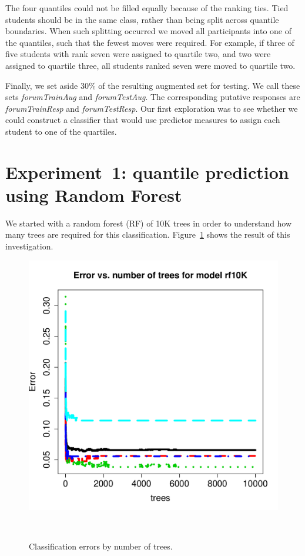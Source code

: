 The four quantiles could not be filled equally because of the ranking
ties. Tied students should be in the same class, rather than being
split across quantile boundaries. When such splitting occurred we
moved all participants into one of the quantiles, such that the fewest
moves were required. For example, if three of five students with rank
seven were assigned to quartile two, and two were assigned to quartile
three, all students ranked seven were moved to quartile two.

Finally, we set aside 30\% of the resulting augmented set for
testing.  We call these sets \emph{forumTrainAug} and
\emph{forumTestAug}. The corresponding putative responses are
\emph{forumTrainResp} and \emph{forumTestResp}.  Our first exploration
was to see whether we could construct a classifier that would use
predictor measures to assign each student to one of the quartiles.


\section{Experiment~1: quantile prediction using Random Forest}

We started with a random forest (RF) of 10K trees in order to
understand how many trees are required for this
classification. Figure~\ref{fig:numNeededTrees} shows the result of
this investigation. 
\begin{figure}[H] 
\centering
  \includegraphics[width=0.8\columnwidth]{Figs/forum_errorsByNumTrees10K.pdf}
  \caption{Classification errors by number of trees.}
  ~\label{fig:numNeededTrees}
\end{figure}
\vspace{-1.0cm}


